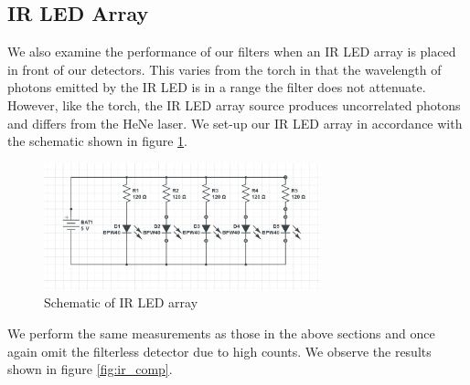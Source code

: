 \documentclass[letterpaper, 11 pt]{article}
\begin{document}
\subsection{IR LED Array}
We also examine the performance of our filters when an IR LED array is placed in front of
our detectors. This varies from the torch in that the wavelength of photons emitted by
the IR LED is in a range the filter does not attenuate. However, like the torch, the IR LED array source produces
uncorrelated photons and differs from the HeNe laser. We set-up our IR LED array in accordance with the schematic shown in figure \ref{fig:led_scheme}.
\begin{figure}[H]
    \centering
    \includegraphics[width = 8cm]{IR_LED.jpg}
    \caption{Schematic of IR LED array}
    \label{fig:led_scheme}
\end{figure}
We perform the same measurements as those in the above sections and once again omit
the filterless detector due to high counts. We observe the results shown in figure \ref{fig:ir_comp}.
\end{document}
